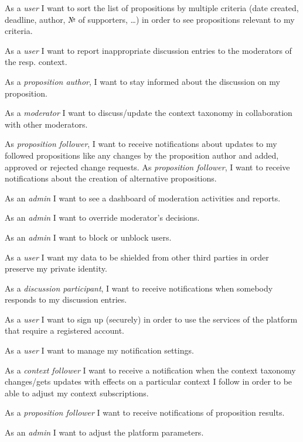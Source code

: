  As a \textit{user} I want to sort the list of propositions by multiple criteria (date created, deadline, author, № of supporters, …) in order to see propositions relevant to my criteria.

 As a \textit{user} I want to report inappropriate discussion entries to the moderators of the resp. context.

 As a \textit{proposition author}, I want to stay informed about the discussion on my proposition.

 As a \textit{moderator} I want to discuss/update the context taxonomy in collaboration with other moderators.

 As \textit{proposition follower}, I want to receive notifications about updates to my followed propositions like any changes by the proposition author and added, approved or rejected change requests.
 As \textit{proposition follower}, I want to receive notifications about the creation of alternative propositions.

 As an \textit{admin} I want to see a dashboard of moderation activities and reports.

 As an \textit{admin} I want to override moderator’s decisions.

 As an \textit{admin} I want to block or unblock users.

 As a \textit{user} I want my data to be shielded from other third parties in order preserve my private identity.

 As a \textit{discussion participant}, I want to receive notifications when somebody responds to my discussion entries.

 As a \textit{user} I want to sign up (securely) in order to use the services of the platform that require a registered account.

 As a \textit{user} I want to manage my notification settings.

 As a \textit{context follower} I want to receive a notification when the context taxonomy changes/gets updates with effects on a particular context I follow in order to be able to adjust my context subscriptions.

 As a \textit{proposition follower} I want to receive notifications of proposition results.

 As an \textit{admin} I want to adjust the platform parameters.


